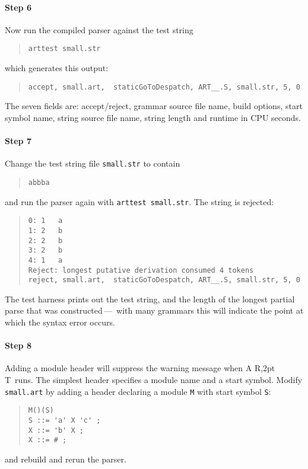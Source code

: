 \documentclass[11pt]{article}
\newcommand{\art}{{\rm A\kern -2pt R\kern -2,2pt T}}
\begin{document}
\paragraph{Step 6}
Now run the compiled parser against the test string
\begin{quote}
\begin{verbatim}
arttest small.str
\end{verbatim}
\end{quote}
which generates this output:
\begin{quote}
\begin{verbatim}
accept, small.art,  staticGoToDespatch, ART__.S, small.str, 5, 0
\end{verbatim}
\end{quote}
The seven fields are: accept/reject, grammar source file name, build
options, start symbol name, string source file name, string length and
runtime in CPU seconds.
\paragraph{Step 7}
Change the test string file {\tt small.str} to contain
\begin{quote}
\begin{verbatim}
abbba
\end{verbatim}
\end{quote}
and run the parser again with \verb+arttest small.str+. The string is rejected:
\begin{quote}
\begin{verbatim}
0: 1   a
1: 2   b
2: 2   b
3: 2   b
4: 1   a
Reject: longest putative derivation consumed 4 tokens
reject, small.art,  staticGoToDespatch, ART__.S, small.str, 5, 0
\end{verbatim}
\end{quote}
The test harness prints out the test string, and the length of the
longest partial parse that was constructed\,---\, with many grammars
this will indicate the point at which the syntax error occurs.

\paragraph{Step 8}
Adding a module header will suppress the warning message when \art\
runs. The simplest header specifies a module name and a start
symbol. Modify {\tt small.art} by adding a header declaring a module
{\tt M} with start symbol {\tt S}:
\begin{quote}
\begin{verbatim}
M()(S)
S ::= 'a' X 'c' ;
X ::= 'b' X ;
X ::= # ;
\end{verbatim}
\end{quote}
and rebuild and rerun the parser.
\end{document}
